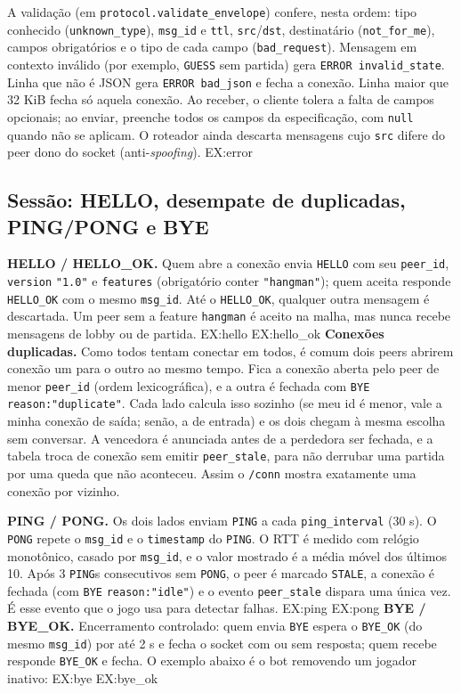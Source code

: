 \documentclass[11pt,a4paper]{article}
\begin{document}
A validação (em \texttt{protocol.validate\_envelope}) confere, nesta ordem: tipo conhecido (\texttt{unknown\_type}), \texttt{msg\_id} e \texttt{ttl}, \texttt{src}/\texttt{dst}, destinatário (\texttt{not\_for\_me}), campos obrigatórios e o tipo de cada campo (\texttt{bad\_request}). Mensagem em contexto inválido (por exemplo, \texttt{GUESS} sem partida) gera \texttt{ERROR invalid\_state}. Linha que não é JSON gera \texttt{ERROR bad\_json} e fecha a conexão. Linha maior que 32 KiB fecha só aquela conexão. Ao receber, o cliente tolera a falta de campos opcionais; ao enviar, preenche todos os campos da especificação, com \texttt{null} quando não se aplicam. O roteador ainda descarta mensagens cujo \texttt{src} difere do peer dono do socket (anti-\emph{spoofing}).
{{EX:error}}

\subsection{Sessão: HELLO, desempate de duplicadas, PING/PONG e BYE}
\textbf{HELLO / HELLO\_OK.} Quem abre a conexão envia \texttt{HELLO} com seu \texttt{peer\_id}, \texttt{version} \texttt{"1.0"} e \texttt{features} (obrigatório conter \texttt{"hangman"}); quem aceita responde \texttt{HELLO\_OK} com o mesmo \texttt{msg\_id}. Até o \texttt{HELLO\_OK}, qualquer outra mensagem é descartada. Um peer sem a feature \texttt{hangman} é aceito na malha, mas nunca recebe mensagens de lobby ou de partida.
{{EX:hello}}
{{EX:hello_ok}}
\textbf{Conexões duplicadas.} Como todos tentam conectar em todos, é comum dois peers abrirem conexão um para o outro ao mesmo tempo. Fica a conexão aberta pelo peer de menor \texttt{peer\_id} (ordem lexicográfica), e a outra é fechada com \texttt{BYE} \texttt{reason:"duplicate"}. Cada lado calcula isso sozinho (se meu id é menor, vale a minha conexão de saída; senão, a de entrada) e os dois chegam à mesma escolha sem conversar. A vencedora é anunciada antes de a perdedora ser fechada, e a tabela troca de conexão sem emitir \texttt{peer\_stale}, para não derrubar uma partida por uma queda que não aconteceu. Assim o \texttt{/conn} mostra exatamente uma conexão por vizinho.

\textbf{PING / PONG.} Os dois lados enviam \texttt{PING} a cada \texttt{ping\_interval} (30 s). O \texttt{PONG} repete o \texttt{msg\_id} e o \texttt{timestamp} do \texttt{PING}. O RTT é medido com relógio monotônico, casado por \texttt{msg\_id}, e o valor mostrado é a média móvel dos últimos 10. Após 3 \texttt{PING}s consecutivos sem \texttt{PONG}, o peer é marcado \texttt{STALE}, a conexão é fechada (com \texttt{BYE} \texttt{reason:"idle"}) e o evento \texttt{peer\_stale} dispara uma única vez. É esse evento que o jogo usa para detectar falhas.
{{EX:ping}}
{{EX:pong}}
\textbf{BYE / BYE\_OK.} Encerramento controlado: quem envia \texttt{BYE} espera o \texttt{BYE\_OK} (do mesmo \texttt{msg\_id}) por até 2 s e fecha o socket com ou sem resposta; quem recebe responde \texttt{BYE\_OK} e fecha. O exemplo abaixo é o bot removendo um jogador inativo:
{{EX:bye}}
{{EX:bye_ok}}
\end{document}
